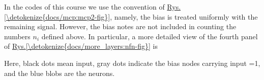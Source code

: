 \documentclass[a4paper,12pt,polish]{jupyterBook}
\begin{document}
\sphinxAtStartPar
In the codes of this course we use the convention of \hyperref[\detokenize{docs/mcp:mcp2-fig}]{Rys.\@ \ref{\detokenize{docs/mcp:mcp2-fig}}}, namely, the bias is treated uniformly with the remaining signal. However, the bias notes are not included in counting the numbers \(n_i\) defined above. In particular, a more detailed view of the fourth panel of \hyperref[\detokenize{docs/more_layers:nfn-fig}]{Rys.\@ \ref{\detokenize{docs/more_layers:nfn-fig}}} is
\begin{sphinxVerbatimInput}

\begin{sphinxVerbatim}[commandchars=\\\{\}]
\end{sphinxVerbatim}
\end{sphinxVerbatimInput}
\begin{sphinxVerbatimOutput}

\noindent{}
\end{sphinxVerbatimOutput}

\sphinxAtStartPar
Here, black dots mean input, gray dots indicate the bias nodes carrying input =1, and the blue blobs are the neurons.
\end{document}
